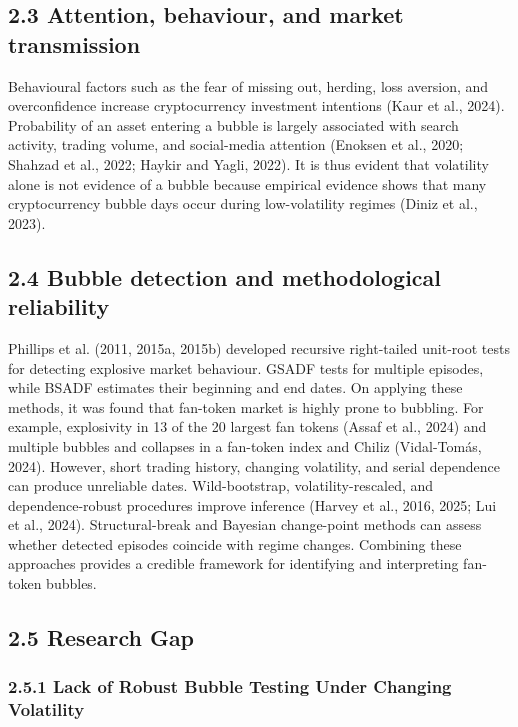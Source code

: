 \documentclass[11pt,a4paper,onecolumn]{article}
\begin{document}
\subsection{2.3 Attention, behaviour, and market transmission}

Behavioural factors such as the fear of missing out, herding, loss aversion, and overconfidence increase cryptocurrency investment intentions (Kaur et al., 2024). Probability of an asset entering a bubble is largely associated with search activity, trading volume, and social-media attention (Enoksen et al., 2020; Shahzad et al., 2022; Haykir and Yagli, 2022). It is thus evident that volatility alone is not evidence of a bubble because empirical evidence shows that many cryptocurrency bubble days occur during low-volatility regimes (Diniz et al., 2023).

\subsection{2.4 Bubble detection and methodological reliability}

Phillips et al. (2011, 2015a, 2015b) developed recursive right-tailed unit-root tests for detecting explosive market behaviour. GSADF tests for multiple episodes, while BSADF estimates their beginning and end dates. On applying these methods, it was found that fan-token market is highly prone to bubbling. For example, explosivity in 13 of the 20 largest fan tokens (Assaf et al., 2024) and multiple bubbles and collapses in a fan-token index and Chiliz (Vidal-Tomás, 2024). However, short trading history, changing volatility, and serial dependence can produce unreliable dates. Wild-bootstrap, volatility-rescaled, and dependence-robust procedures improve inference (Harvey et al., 2016, 2025; Lui et al., 2024). Structural-break and Bayesian change-point methods can assess whether detected episodes coincide with regime changes. Combining these approaches provides a credible framework for identifying and interpreting fan-token bubbles.

\subsection{2.5 Research Gap}

\subsubsection{2.5.1 Lack of Robust Bubble Testing Under Changing Volatility}
\end{document}
